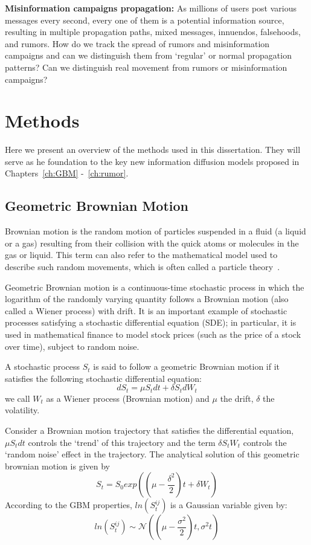 \noindent
{\bf Misinformation campaigns propagation:} As millions of users post various messages every second, every one of them is a potential information source, resulting in
multiple propagation paths, mixed messages, innuendos, falsehoods, and rumors.
How do we track the spread of rumors and misinformation campaigns and can we distinguish them
from `regular' or normal propagation patterns? Can we distinguish real movement from rumors or misinformation campaigns?\\


\section{Methods}
Here we present an overview of the methods used in this dissertation.
They will serve as he foundation to the key new information diffusion models proposed  in Chapters~\ref{ch:GBM} -~\ref{ch:rumor}.

\subsection{Geometric Brownian Motion}
Brownian motion is the random motion of particles suspended in a fluid (a liquid or a gas) resulting from their collision with the quick atoms or molecules in the gas or liquid. This term
can also refer to the mathematical model used to describe such random movements, which is often called a particle theory~\cite{morters2010brownian}.

Geometric Brownian motion is a continuous-time stochastic process in which the logarithm of the randomly varying quantity follows a Brownian motion (also called a Wiener process) with drift. It is an important example of stochastic processes satisfying a stochastic differential equation (SDE); in particular, it is used in mathematical finance to model stock prices (such as the price of a stock over time), subject to random noise.

A stochastic process $S_t$ is said to follow a geometric Brownian motion if it satisfies the following stochastic differential equation:
$$d S_t = \mu S_t dt + \delta S_t dW_t $$
we call $W_t$ as a Wiener process (Brownian motion) and $\mu$ the drift, $\delta$ the volatility.

Consider a Brownian motion trajectory that satisfies the differential equation, $\mu S_t dt$ controls the `trend' of this trajectory and the term $\delta S_t W_t$ controls the `random noise' effect in the trajectory. The analytical solution of this geometric brownian motion is given by $$S_t = S_0 exp((\mu-\frac{\delta^2}{2})t + \delta W_t) $$
According to the GBM properties, $ln(S_{t}^{ij})$ is a Gaussian variable given by:
$$ln(S_{t}^{ij})\sim \mathcal{N}((\mu - \frac{\sigma^2}{2})t, \sigma ^{2}t)$$


